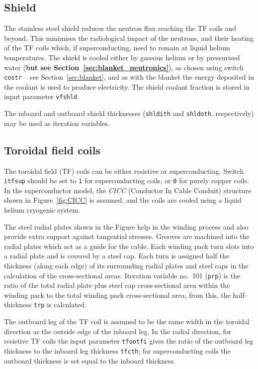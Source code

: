 \documentclass[11pt,a4paper]{report}
\begin{document}
\subsection{Shield}

The stainless steel shield reduces the neutron flux reaching the TF coils and
beyond. This minimises the radiological impact of the neutrons, and their
heating of the TF coils which, if superconducting, need to remain at liquid
helium temperatures. The shield is cooled either by gaseous helium or by
pressurised water (\textbf{but see Section~\ref{sec:blanket_neutronics}}), as
chosen using switch \texttt{costr} -- see Section~\ref{sec:blanket}, and as
with the blanket the energy deposited in the coolant is used to produce
electricity. The shield coolant fraction is stored in input parameter
\texttt{vfshld}.

The inboard and outboard shield thicknesses (\texttt{shldith} and
\texttt{shldoth}, respectively) may be used as iteration variables.

\subsection{Toroidal field coils}
\label{sec:tfcoil}

The toroidal field (TF) coils can be either resistive or
superconducting. Switch \texttt{itfsup} should be set to \texttt{1} for
superconducting coils, or \texttt{0} for purely copper coils. In the
superconductor model, the \textit{CICC}\/ (Conductor In Cable Conduit)
structure shown in Figure~\ref{fig:CICC} is assumed, and the coils are cooled
using a liquid helium cryogenic system.

The steel radial plates shown in the Figure help in the winding process and
also provide extra support against tangential stresses. Grooves are machined
into the radial plates which act as a guide for the cable. Each winding pack
turn slots into a radial plate and is covered by a steel cap. Each turn is
assigned half the thickness (along each edge) of its surrounding radial plates
and steel caps in the calculation of the cross-sectional areas. Iteration
variable no.\ 101 (\texttt{prp}) is the ratio of the total radial plate plus
steel cap cross-sectional area within the winding pack to the total winding
pack cross-sectional area; from this, the half-thickness \texttt{trp} is
calculated.

The outboard leg of the TF coil is assumed to be the same width in the
toroidal direction as the outside edge of the inboard leg. In the radial
direction, for resistive TF coils the input parameter \texttt{tfootfi} gives
the ratio of the outboard leg thickness to the inboard leg thickness
\texttt{tfcth}; for superconducting coils the outboard thickness is set equal
to the inboard thickness.
\end{document}

